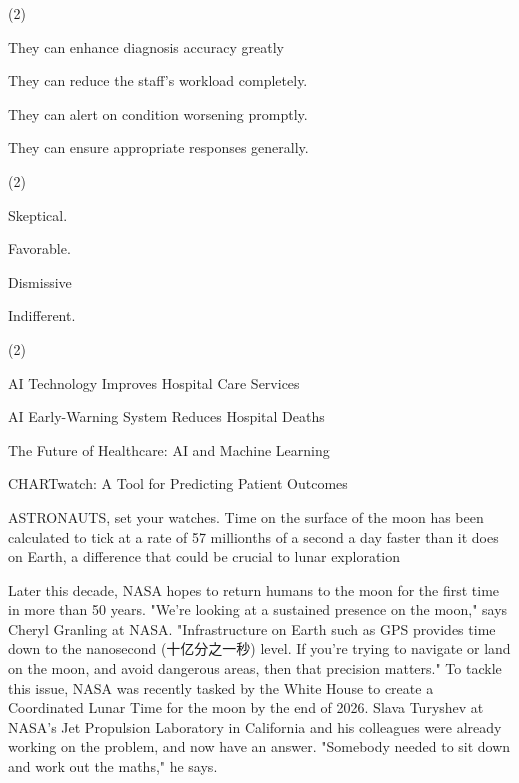 \documentclass{英语试卷}
\begin{document}
\begin{choices}(2)
  \item They can enhance diagnosis accuracy greatly
  \item They can reduce the staff's workload completely.
  \item They can alert on condition worsening promptly.
  \item They can ensure appropriate responses generally.
\end{choices}
\begin{choices}(2)
  \item Skeptical.
  \item Favorable.
  \item Dismissive
  \item Indifferent.
\end{choices}
\begin{choices}(2)
  \item AI Technology Improves Hospital Care Services
  \item AI Early-Warning System Reduces Hospital Deaths
  \item The Future of Healthcare: AI and Machine Learning
  \item CHARTwatch: A Tool for Predicting Patient Outcomes
\end{choices}
\par ASTRONAUTS, set your watches. Time on the surface of the moon has been calculated to tick at a rate of 57 millionths of a second a day faster than it does on Earth, a difference that could be crucial to lunar exploration\par
\par Later this decade, NASA hopes to return humans to the moon for the first time in more than 50 years. "We’re looking at a sustained presence on the moon," says Cheryl Granling at NASA. "Infrastructure on Earth such as GPS provides time down to the nanosecond (十亿分之一秒) level. If you're trying to navigate or land on the moon, and avoid dangerous areas, then that precision matters." To tackle this issue, NASA was recently tasked by the White House to create a Coordinated Lunar Time for the moon by the end of 2026. Slava Turyshev at NASA's Jet Propulsion Laboratory in California and his colleagues were already working on the problem, and now have an answer. "Somebody needed to sit down and work out the maths," he says.\par
\end{document}
